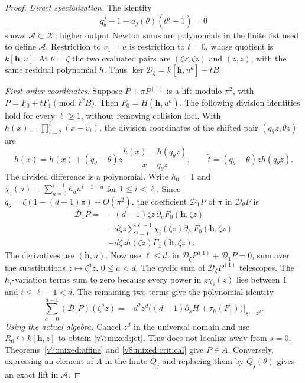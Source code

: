 \documentclass[10pt,fleqn]{article}
\numberwithin{equation}{section}
\begin{document}
\begin{proof}
\textit{Direct specialization.}
The identity
\[
 q_\theta^j-1+a_j(\theta)(\theta^j-1)=0
\]
shows $\mathscr A\subset\mathscr K$; higher output Newton sums are
polynomials in the finite list used to define $\mathscr A$.
Restriction to $v_1=u$ is restriction to $t=0$, whose quotient is
$k[\mathbf h,u]$.  At $\theta=\zeta$ the two evaluated pairs are
$(\zeta z,\zeta z)$ and $(z,z)$, with the same residual polynomial $h$.
Thus $\ker\mathscr D_\zeta=k[\mathbf h,u^d]+tB$.

\textit{First-order coordinates.}\label{r23:mixed:first-variation}
Suppose $P+\pi P^{(1)}$ is a lift modulo $\pi^2$, with
$P=F_0+tF_1\pmod{t^2B}$.  Then $F_0=H(\mathbf h,u^d)$.
The following division identities hold for every $\ell\ge1$, without
removing collision loci.  With
$h(x)=\prod_{i=2}^{\ell}(x-v_i)$, the division coordinates of the shifted
pair $(q_\theta z,\theta z)$ are
\[
 \widetilde h(x)=h(x)+(q_\theta-\theta)z
       \frac{h(x)-h(q_\theta z)}{x-q_\theta z},\qquad
 \widetilde t=(q_\theta-\theta)z h(q_\theta z).
\]
The divided difference is a polynomial.  Write $h_0=1$ and
$\chi_i(u)=\sum_{a=0}^{i-1}h_a u^{i-1-a}$ for $1\le i<\ell$.
Since
$q_\theta=\zeta(1-(d-1)\pi)+O(\pi^2)$, the coefficient
$\mathscr D_1P$ of $\pi$ in $\mathscr D_\theta P$ is
\[
 \begin{split}
 \mathscr D_1P={}&-(d-1)\zeta z\,\partial_uF_0(\mathbf h,\zeta z)\\
 &-d\zeta z\sum_{i=1}^{\ell-1}\chi_i(\zeta z)
                         \partial_{h_i}F_0(\mathbf h,\zeta z)\\
 &-d\zeta z h(\zeta z)F_1(\mathbf h,\zeta z).
 \end{split}
\]
The derivatives use $(\mathbf h,u)$.  Now use $\ell\le d$: in
$\mathscr D_\zeta P^{(1)}+\mathscr D_1P=0$, sum over the substitutions
$z\mapsto\zeta^a z$, $0\le a<d$.
The cyclic sum of $\mathscr D_\zeta P^{(1)}$ telescopes.
The $h_i$-variation terms sum to zero because every power in
$z\chi_i(z)$ lies between $1$ and $i\le\ell-1<d$.
The remaining two terms give the polynomial identity
\[
 \sum_{a=0}^{d-1}(\mathscr D_1P)(\zeta^az)
 =-d^2z^d\bigl((d-1)\partial_sH+
                       \tau_h(F_1)\bigr)\big|_{s=z^d}.
\]
\textit{Using the actual algebra.}
Cancel $z^d$ in the universal domain and use
$R_0\hookrightarrow k[\mathbf h,z]$ to obtain \eqref{v7:mixed:jet}.
This does not localize away from $s=0$.
Theorems~\ref{v7:mixed:affine} and \ref{v8:mixed:critical} give $P\in A$.
Conversely, expressing an element of $A$ in the finite $Q_j$ and replacing
them by $Q_j(\theta)$ gives an exact lift in $\mathscr A$.


\end{proof}
\end{document}
